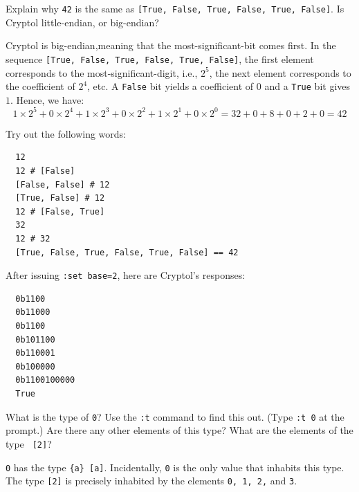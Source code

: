 \begin{Exercise}\label{ex:words:0}
  Explain why {\tt 42} is the same as {\tt [True, False, True, False,
    True, False]}.  Is Cryptol little-endian, or
  big-endian?\indEndianness
\end{Exercise}
\begin{Answer}
  Cryptol is big-endian,\indEndianness meaning that the
  most-significant-bit comes first. In the sequence {\tt [True, False,
    True, False, True, False]}, the first element corresponds to the
  most-significant-digit, i.e., $2^5$, the next element corresponds to
  the coefficient of $2^4$, etc.  A {\tt False} bit yields a
  coefficient of $0$ and a {\tt True} bit gives $1$. Hence, we have:
$$1\times2^5 + 0\times2^4 + 1\times2^3 + 0\times2^2 + 1\times2^1 + 0\times2^0 = 32 + 0 + 8 + 0 + 2 + 0 = 42$$
\end{Answer}

\begin{Exercise}\label{ex:words:1}
  Try out the following words: \indSettingBase
\begin{Verbatim}
  12
  12 # [False]
  [False, False] # 12
  [True, False] # 12
  12 # [False, True]
  32
  12 # 32
  [True, False, True, False, True, False] == 42
\end{Verbatim}
\end{Exercise}
\begin{Answer}
  After issuing {\tt :set base=2}, here are Cryptol's
  responses:\indSettingBase
\begin{Verbatim}
  0b1100
  0b11000
  0b1100
  0b101100
  0b110001
  0b100000
  0b1100100000
  True
\end{Verbatim}
\end{Answer}

\begin{Exercise}\label{ex:words:2}
  What is the type of {\tt 0}?  Use the {\tt :t} command to find this
  out.  (Type {\tt :t 0} at the prompt.\indSettingType) Are there any
  other elements of this type? What are the elements of the type {\tt
    [2]}?
\end{Exercise}
\begin{Answer}
{\tt 0} has the type {\tt \Verb+{a} [a]+}.
Incidentally, {\tt 0} is the only value that inhabits this type. The
type {\tt [2]} is precisely inhabited by the elements {\tt 0, 1, 2,}
and {\tt 3}.
\end{Answer}

